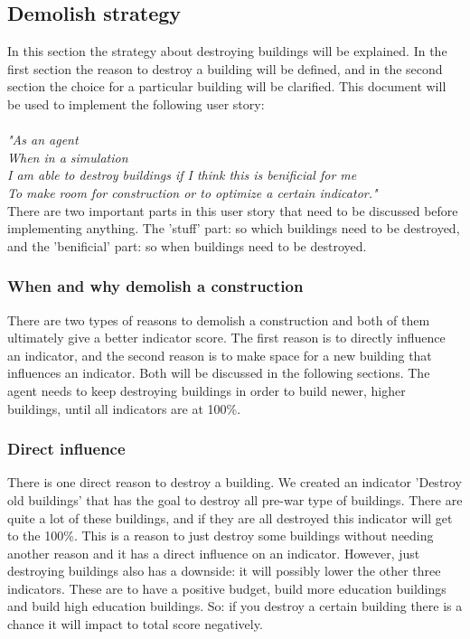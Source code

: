 \subsection{Demolish strategy}
In this section the strategy about destroying buildings will be explained. In the first section the reason to destroy a building will be defined, and in the second section the choice for a particular building will be clarified. This document will be used to implement the following user story:\\
\\
\textit{"As an agent\\
When in a simulation\\
I am able to destroy buildings if I think 
this is benificial for me\\
To make room for construction or to 
optimize a certain indicator."\\}
There are two important parts in this user story that need to be discussed before implementing anything. The 'stuff' part: so which buildings need to be destroyed, and the 'benificial' part: so when buildings need to be destroyed.

\subsubsection{When and why demolish a construction}
There are two types of reasons to demolish a construction and both of them ultimately give a better indicator score. The first reason is to directly influence an indicator, and the second reason is to make space for a new building that influences an indicator. Both will be discussed in the following sections. The agent needs to keep destroying buildings in order to build newer, higher buildings, until all indicators are at 100\%.

\subsubsection{Direct influence}
There is one direct reason to destroy a building. We created an indicator 'Destroy old buildings' that has the goal to destroy all pre-war type of buildings. There are quite a lot of these buildings, and if they are all destroyed this indicator will get to the 100\%. This is a reason to just destroy some buildings without needing another reason and it has a direct influence on an indicator. However, just destroying buildings also has a downside: it will possibly lower the other three indicators. These are to have a positive budget, build more education buildings and build high education buildings. So: if you destroy a certain building there is a chance it will impact to total score negatively. 

